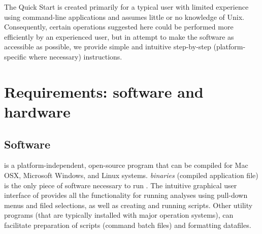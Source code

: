 The Quick Start is created primarily for a typical user with limited experience using command-line applications and assumes little or no knowledge of Unix. Consequently, certain operations suggested here could be performed more efficiently by an experienced user, but in attempt to make the software as accessible as possible, we provide simple and intuitive step-by-step (platform-specific where necessary) instructions. 

\section{Requirements: software and hardware}

\subsection{Software}
\poy is a platform-independent, open-source program that can be compiled for Mac OSX, Microsoft Windows, and Linux systems. \poy \emph{binaries} (compiled application file) is the only piece of software necessary to run \poy. The intuitive graphical user interface of \poy provides all the functionality for running analyses using pull-down menus and filed selections, as well as creating and running \poy scripts. Other utility programs (that are typically installed with major operation systems), can facilitate preparation of \poy scripts (\poy command batch files) and formatting datafiles.

